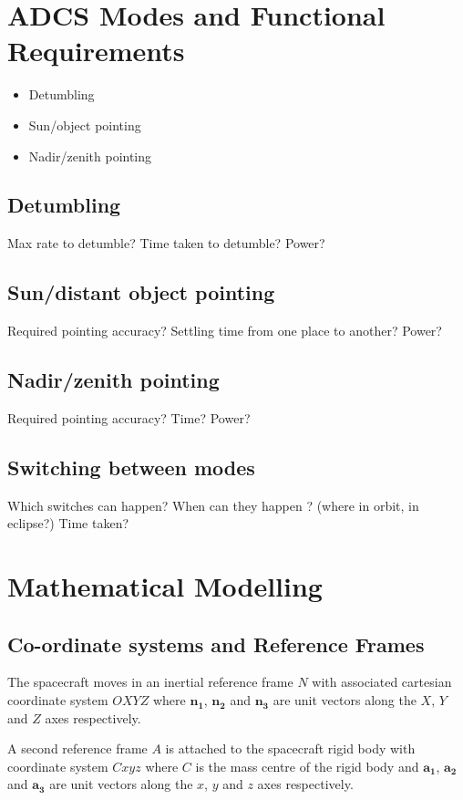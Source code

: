 \section{ADCS Modes and Functional Requirements}

\begin{itemize}
\item Detumbling
\item Sun/object pointing
\item Nadir/zenith pointing
\end{itemize}

\subsection{Detumbling} %
Max rate to detumble?
Time taken to detumble?
Power?

\subsection{Sun/distant object pointing} %
Required pointing accuracy?
Settling time from one place to another?
Power?

\subsection{Nadir/zenith pointing} %
Required pointing accuracy?
Time?
Power?

\subsection{Switching between modes} %
Which switches can happen?
When can they happen ? (where in orbit, in eclipse?)
Time taken?

\section{Mathematical Modelling}
\subsection{Co-ordinate systems and Reference Frames}

The spacecraft moves in an inertial reference frame $N$ with associated cartesian coordinate system $OXYZ$ where $\mathbf{n_1}$, $\mathbf{n_2}$ and $\mathbf{n_3}$ are unit vectors along the $X$, $Y$ and $Z$ axes respectively.

A second reference frame $A$ is attached to the spacecraft rigid body with coordinate system $Cxyz$ where $C$ is the mass centre of the rigid body and $\mathbf{a_1}$, $\mathbf{a_2}$ and $\mathbf{a_3}$ are unit vectors along the $x$, $y$ and $z$ axes respectively.

